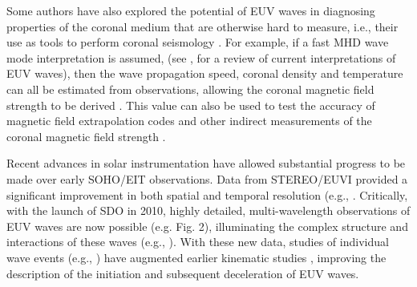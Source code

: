 Some authors have also explored the potential of EUV waves in
diagnosing properties of the coronal medium that are otherwise hard to
measure, i.e., their use as tools to perform coronal seismology
\citep{1970PASJ...22..341U}. For example, if a fast MHD wave mode
interpretation is assumed, (see \cite{2011SSRv..158..365G}, for a
review of current interpretations of EUV waves), then the wave
propagation speed, coronal density and temperature can all be
estimated from observations, allowing the coronal magnetic field
strength to be derived \cite{2005LRSP....2....3N}.  This value can
also be used to test the accuracy of magnetic field extrapolation
codes \citep{2008ApJ...675.1637S} and other indirect measurements of
the coronal magnetic field strength \citep{2007Sci...317.1192T}.







Recent advances in solar instrumentation have allowed substantial
progress to be made over early SOHO/EIT observations. Data from
STEREO/EUVI provided a significant improvement in both spatial and
temporal resolution (e.g., \cite{2008ApJ...680L..81L,
  2008ApJ...681L.113V}.  Critically, with the launch of SDO in 2010,
highly detailed, multi-wavelength observations of EUV waves are now
possible (e.g. Fig. 2), illuminating the complex structure and
interactions of these waves (e.g., \cite{2012ApJ...753...52L}). With
these new data, studies of individual wave events (e.g.,
\cite{2011ApJ...741L..21L}) have augmented earlier kinematic studies
\citep{1999SoPh..190..467W, 2000ApJ...543L..89W}, improving the
description of the initiation and subsequent deceleration of EUV
waves.

